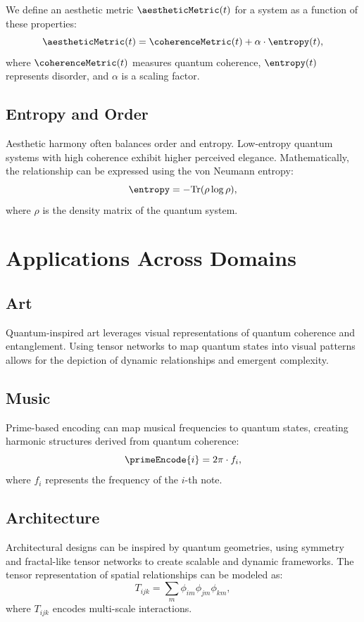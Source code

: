 \documentclass{article}
\theoremstyle{plain}
\begin{document}
We define an aesthetic metric \(\aestheticMetric(t)\) for a system as a function of these properties:
\begin{equation}
\aestheticMetric(t) = \coherenceMetric(t) + \alpha \cdot \entropy(t),
\end{equation}
where \(\coherenceMetric(t)\) measures quantum coherence, \(\entropy(t)\) represents disorder, and \(\alpha\) is a scaling factor.

\subsection{Entropy and Order}
Aesthetic harmony often balances order and entropy. Low-entropy quantum systems with high coherence exhibit higher perceived elegance. Mathematically, the relationship can be expressed using the von Neumann entropy:
\begin{equation}
\entropy = - \text{Tr}(\rho \log \rho),
\end{equation}
where \(\rho\) is the density matrix of the quantum system.

\section{Applications Across Domains}

\subsection{Art}
Quantum-inspired art leverages visual representations of quantum coherence and entanglement. Using tensor networks to map quantum states into visual patterns allows for the depiction of dynamic relationships and emergent complexity.

\subsection{Music}
Prime-based encoding can map musical frequencies to quantum states, creating harmonic structures derived from quantum coherence:
\begin{equation}
\primeEncode{i} = 2 \pi \cdot f_{i},
\end{equation}
where \(f_{i}\) represents the frequency of the \(i\)-th note.

\subsection{Architecture}
Architectural designs can be inspired by quantum geometries, using symmetry and fractal-like tensor networks to create scalable and dynamic frameworks. The tensor representation of spatial relationships can be modeled as:
\begin{equation}
T_{ijk} = \sum_{m} \phi_{im} \phi_{jm} \phi_{km},
\end{equation}
where \(T_{ijk}\) encodes multi-scale interactions.
\end{document}
